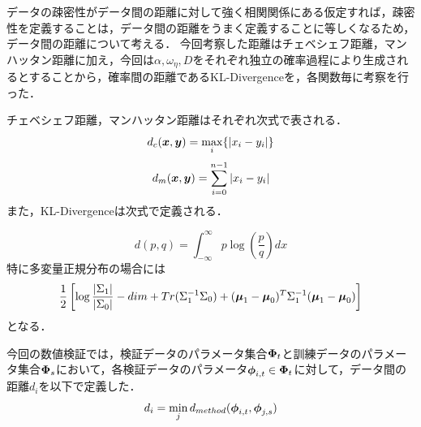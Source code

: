 \documentclass[16.7pt]{jsarticle}
\begin{document}
		データの疎密性がデータ間の距離に対して強く相関関係にある仮定すれば，疎密性を定義することは，データ間の距離をうまく定義することに等しくなるため，データ間の距離について考える．
		今回考察した距離はチェベシェフ距離，マンハッタン距離に加え，今回は$ \alpha,\omega_{\eta},D $をそれぞれ独立の確率過程により生成されるとすることから，確率間の距離であるKL-Divergenceを，各関数毎に考察を行った．
		
		チェベシェフ距離，マンハッタン距離はそれぞれ次式で表される．
		\begin{equation}\label{eq:che_distance}
			d_c(\boldsymbol{x},\boldsymbol{y}) = \max_i \{ |x_i - y_i| \}
		\end{equation}
		\begin{equation}\label{eq:manhattan}
			d_m(\boldsymbol{x},\boldsymbol{y}) = \sum_{i=0}^{n-1} |x_i - y_i|
		\end{equation}
		また，KL-Divergenceは次式で定義される．
		
		\begin{equation}\label{eq:KL-Div}
			d(p,q) = \int_{-\infty}^{\infty} p \log \left( \frac{p}{q}\right) dx
		\end{equation}
		特に多変量正規分布の場合には
		\begin{equation}\label{eq:KL_Div2}
			\frac{1}{2} \left[ \log \frac{|\Sigma_1|}{|\Sigma_0|} -dim + Tr(\Sigma_1^{-1} \Sigma_0 ) + (\boldsymbol{\mu}_1 - \boldsymbol{\mu}_0)^T \Sigma_1^{-1} (\boldsymbol{\mu}_1 - \boldsymbol{\mu}_0)\right]
		\end{equation}
		となる．
		
		今回の数値検証では，検証データのパラメータ集合$\boldsymbol{\Phi}_t $と訓練データのパラメータ集合$ \boldsymbol{\Phi}_s $において，各検証データのパラメータ$ \boldsymbol{\phi}_{i,t} \in \boldsymbol{\Phi}_t  $に対して，データ間の距離$ d_i $を以下で定義した．
		\begin{equation}\label{eq:dist_data}
			d_i = \min_{j} d_{method}(\boldsymbol{\phi}_{i,t} , \boldsymbol{\phi}_{j,s})
		\end{equation}
	 	
\end{document}
